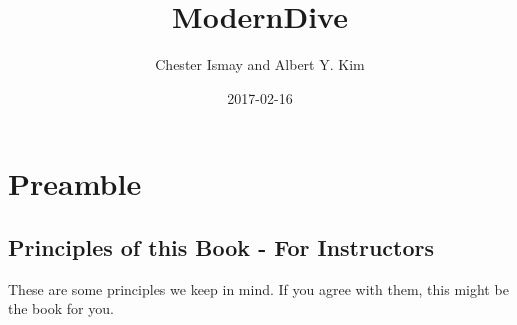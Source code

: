 \documentclass[]{tufte-book}
\title{ModernDive}
\author{Chester Ismay and Albert Y. Kim}
\date{2017-02-16}
\begin{document}
\let\allcaps=\relax
\maketitle



{
\setcounter{tocdepth}{1}
\tableofcontents
}

\chapter{Preamble}\label{preamble}

\section{Principles of this Book - For
Instructors}\label{principles-of-this-book---for-instructors}

These are some principles we keep in mind. If you agree with them, this
might be the book for you.
\end{document}
